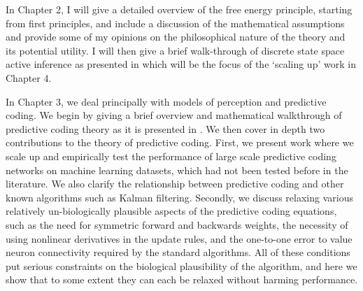 

In Chapter 2, I will give a detailed overview of the free energy principle, starting from first principles, and include a discussion of the mathematical assumptions and provide some of my opinions on the philosophical nature of the theory and its potential utility. I will then give a brief walk-through of discrete state space active inference as presented in \citep{friston2015active,friston2017process,da2020active} which will be the focus of the `scaling up' work in Chapter 4.

In Chapter 3, we deal principally with models of perception and predictive coding. We begin by giving a brief overview and mathematical walkthrough of predictive coding theory as it is presented in \citep{friston2005theory,friston2008hierarchical,buckley2017free}. We then cover in depth two contributions to the theory of predictive coding. 
First, we present work where we scale up and empirically test the performance of large scale predictive coding networks on machine learning datasets, which had not been tested before in the literature. We also clarify the relationship between predictive coding and other known algorithms such as Kalman filtering. Secondly, we discuss relaxing various relatively un-biologically plausible aspects of the predictive coding equations, such as the need for symmetric forward and backwards weights, the necessity of using nonlinear derivatives in the update rules, and the one-to-one error to value neuron connectivity required by the standard algorithms. All of these conditions put serious constraints on the biological plausibility of the algorithm, and here we show that to some extent they can each be relaxed without harming performance. %

